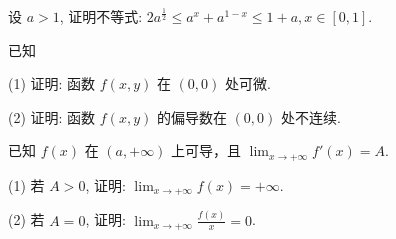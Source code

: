 设 $a > 1$, 证明不等式: $2a^{\frac{1}{2}} \leq a^{x} + a^{1 - x} \leq 1 + a, x \in [0,1]$.\par
\par{}
已知\par
\nopagebreak[4]
(1) 证明: 函数 $f(x, y)$ 在 $(0, 0)$ 处可微.\par
(2) 证明: 函数 $f(x, y)$ 的偏导数在 $(0, 0)$ 处不连续.\par
已知 $f(x)$ 在 $(a, +\infty)$ 上可导，且 $\lim_{x \to +\infty} f'(x) = A$.\par
(1) 若 $A > 0$, 证明: $\lim_{x \to +\infty} f(x) = +\infty$.\par
(2) 若 $A = 0$, 证明: $\lim_{x \to +\infty} \frac{f(x)}{x} = 0$.\par
